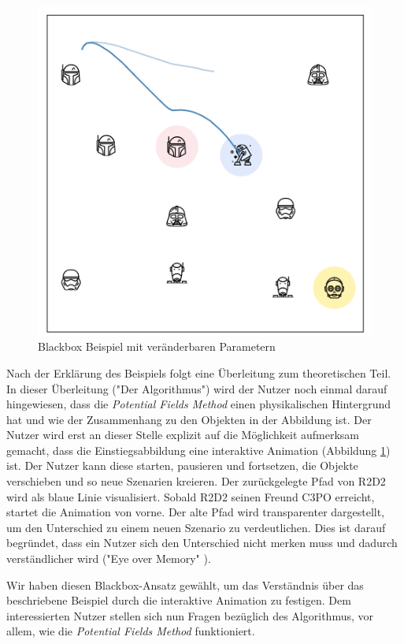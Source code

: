 \begin{figure}[h!]
  \centering
  \includegraphics[width=0.8\linewidth, height=0.8\linewidth]{img/sim2b.png}
  \caption{Blackbox Beispiel mit veränderbaren Parametern}
  \label{fig:sw_blackbox}
\end{figure}

Nach der Erklärung des Beispiels folgt eine Überleitung zum theoretischen Teil. In dieser Überleitung ("Der Algorithmus") wird der Nutzer noch einmal darauf hingewiesen, dass die \textit{Potential Fields Method} einen physikalischen Hintergrund hat und wie der Zusammenhang zu den Objekten in der Abbildung ist.
Der Nutzer wird erst an dieser Stelle explizit auf die Möglichkeit aufmerksam gemacht, dass die Einstiegsabbildung eine interaktive Animation (Abbildung \ref{fig:sw_blackbox}) ist. Der Nutzer kann diese starten, pausieren und fortsetzen, die Objekte verschieben und so neue Szenarien kreieren. Der zurückgelegte Pfad von R2D2 wird als blaue Linie visualisiert. Sobald R2D2 seinen Freund C3PO erreicht, startet die Animation von vorne. Der alte Pfad wird transparenter dargestellt, um den Unterschied zu einem neuen Szenario zu verdeutlichen. Dies ist darauf begründet, dass ein Nutzer sich den Unterschied nicht merken muss und dadurch verständlicher wird ("Eye over Memory" \cite{munzner2015visualization}).

Wir haben diesen Blackbox-Ansatz gewählt, um das Verständnis über das beschriebene Beispiel durch die interaktive Animation zu festigen. Dem interessierten Nutzer stellen sich nun Fragen bezüglich des Algorithmus, vor allem, wie die \textit{Potential Fields Method} funktioniert.

